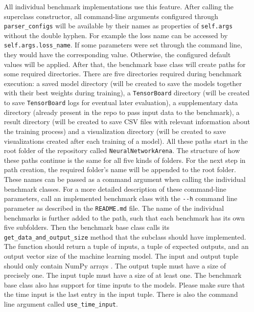 \documentclass[draft,final]{vutinfth} %
\begin{document}
    All individual benchmark implementations use this feature.
    After calling the superclass constructor, all command-line arguments configured through \texttt{parser\_configs} will be available by their names as properties of \texttt{self.args} without the double hyphen.
    For example the loss name can be accessed by \texttt{self.args.loss\_name}.
    If some parameters were set through the command line, they would have the corresponding value. Otherwise, the configured default values will be applied.
    After that, the benchmark base class will create paths for some required directories.
    There are five directories required during benchmark execution: a saved model directory (will be created to save the models together with their best weights during training), a \texttt{TensorBoard} directory (will be created to save \texttt{TensorBoard} logs for eventual later evaluation), a supplementary data directory (already present in the repo to pass input data to the benchmark), a result directory (will be created to save CSV files with relevant information about the training process) and a visualization directory (will be created to save visualizations created after each training of a model).
    All these paths start in the root folder of the repository called \texttt{NeuralNetworkArena}.
    The structure of how these paths continue is the same for all five kinds of folders.
    For the next step in path creation, the required folder's name will be appended to the root folder.
    These names can be passed as a command argument when calling the individual benchmark classes.
    For a more detailed description of these command-line parameters, call an implemented benchmark class with the \texttt{-{}-h} command line parameter as described in the \texttt{README.md} file.
    The name of the individual benchmarks is further added to the path, such that each benchmark has its own five subfolders.
    Then the benchmark base class calls its \texttt{get\_data\_and\_output\_size} method that the subclass should have implemented.
    The function should return a tuple of inputs, a tuple of expected outputs, and an output vector size of the machine learning model.
    The input and output tuple should only contain NumPy arrays \cite{numpy}. The output tuple must have a size of precisely one.
    The input tuple must have a size of at least one.
    The benchmark base class also has support for time inputs to the models.
    Please make sure that the time input is the last entry in the input tuple.
    There is also the command line argument called \texttt{use\_time\_input}.
\end{document}
